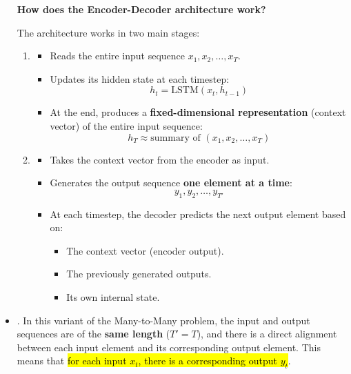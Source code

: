 \begin{itemize}
    \begin{flushleft}
        \textcolor{Green3}{ \textbf{How does the Encoder-Decoder architecture work?}}
    \end{flushleft}
    The architecture works in two main stages:
    \begin{enumerate}
        \item {}
        \begin{itemize}
            \item Reads the entire input sequence $x_1, x_2, \ldots, x_T$.
            \item Updates its hidden state at each timestep:
            \begin{equation*}
                h_t = \text{LSTM}\left(x_t, h_{t-1}\right)
            \end{equation*}
            \item At the end, produces a \textbf{fixed-dimensional representation} (context vector) of the entire input sequence:
            \begin{equation*}
                h_T \approx \text{summary of } \left(x_1, x_2, \ldots, x_T\right)
            \end{equation*}
        \end{itemize}
        \item {}
        \begin{itemize}
            \item Takes the context vector from the encoder as input.
            \item Generates the output sequence \textbf{one element at a time}:
            \begin{equation*}
                y_1, y_2, \ldots, y_{T'}
            \end{equation*}
            \item At each timestep, the decoder predicts the next output element based on:
            \begin{itemize}
                \item The context vector (encoder output).
                \item The previously generated outputs.
                \item Its own internal state.
            \end{itemize}
        \end{itemize}
    \end{enumerate}


    \item[\textcolor{Red3}{\faIcon{book}}] . In this variant of the Many-to-Many problem, the input and output sequences are of the \textbf{same length} ($T' = T$), and there is a direct alignment between each input element and its corresponding output element. This means that \hl{for each input $x_t$, there is a corresponding output $y_t$}.
    

\end{itemize}
